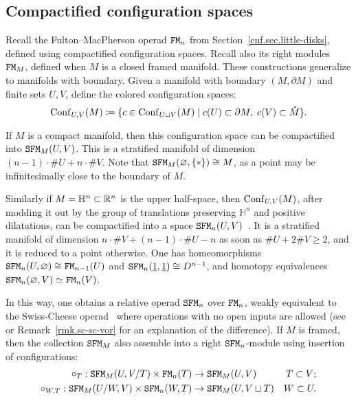 \subsection{Compactified configuration spaces}
\label{cnfbnd.sec.comp-conf-spac}

Recall the Fulton--MacPherson operad $\mathtt{FM}_{n}$ from Section~\ref{cnf.sec.little-disks}, defined using compactified configuration spaces.
Recall also its right modules $\mathtt{FM}_{M}$, defined when $M$ is a closed framed manifold.
These constructions generalize to manifolds with boundary.
Given a manifold with boundary $(M, \partial M)$ and finite sets $U, V$, define the colored configuration spaces:
\begin{equation}
  \operatorname{Conf}_{U,V}(M) \coloneqq \{ c \in \operatorname{Conf}_{U \sqcup V}(M) \mid c(U) \subset \partial M, \; c(V) \subset \mathring{M} \}.
\end{equation}

If $M$ is a compact manifold, then this configuration space can be compactified into $\mathtt{SFM}_{M}(U,V)$.
This is a stratified manifold of dimension $(n-1) \cdot \# U + n \cdot \# V$.
Note that $\mathtt{SFM}_{M}(\varnothing, \{*\}) \cong M$, as a point may be infinitesimally close to the boundary of $M$.

Similarly if $M = \mathbb{H}^{n} \subset \mathbb{R}^{n}$ is the upper half-space, then $\operatorname{Conf}_{U,V}(M)$, after modding it out by the group of translations preserving $\mathbb{H}^{n}$ and positive dilatations, can be compactified into a space $\mathtt{SFM}_{n}(U,V)$~\cite{Voronov1999}.
It is a stratified manifold of dimension $n \cdot \# V + (n-1) \cdot \# U - n$ as soon as $\#U + 2 \#V \ge 2$, and it is reduced to a point otherwise.
One has homeomorphisms $\mathtt{SFM}_{n}(U, \varnothing) \cong \mathtt{FM}_{n-1}(U)$ and $\mathtt{SFM}_{n}(\underline{1}, \underline{1}) \cong D^{n-1}$, and homotopy equivalences $\mathtt{SFM}_{n}(\varnothing, V) \simeq \mathtt{FM}_{n}(V)$.

In this way, one obtains a relative operad $\mathtt{SFM}_{n}$ over $\mathtt{FM}_{n}$, weakly equivalent to the Swiss-Cheese operad~\cite{Voronov1999} where operations with no open inputs are allowed (see~\cite[Section~3]{HoefelLivernet2012} or Remark~\ref{rmk.sc-sc-vor} for an explanation of the difference).
If $M$ is framed, then the collection $\mathtt{SFM}_{M}$ also assemble into a right $\mathtt{SFM}_{n}$-module using insertion of configurations:
\begin{align}
  \circ_{T} : \mathtt{SFM}_{M}(U, V/T) \times \mathtt{FM}_{n}(T)
  & \to \mathtt{SFM}_{M}(U,V)
  & T \subset V; \\
  \circ_{W,T} : \mathtt{SFM}_{M}(U/W, V) \times \mathtt{SFM}_{n}(W,T)
  & \to \mathtt{SFM}_{M}(U, V \sqcup T)
  & W \subset U.
\end{align}

